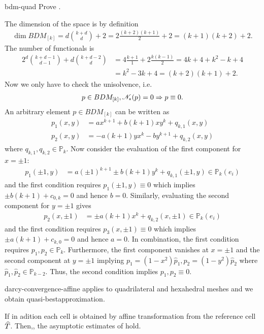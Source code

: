 \begin{Problem}{bdm-quad}
  Prove .
\begin{solution}
 The dimension of the space is by definition
 \begin{align}
    \dim BDM_{[k]} = d\binom{k+d}{d}+2=2\frac{(k+2)(k+1)}{2}+2=(k+1)(k+2)+2.
 \end{align}
 The number of functionals is
 \begin{align}
  2^d \binom{k+d-1}{d-1}+d \binom{k+d-2}{d} &= 4 \frac{k+1}{1}+2\frac{k(k-1)}{2}
  = 4k+4+k^2-k+4\\
  &= k^2-3k+4 = (k+2)(k+1)+2.
 \end{align}
 Now we only have to check the unisolvence, i.e.
 \begin{align}
p\in BDM_{[k]}, \mathscr N_* (p) = 0 \Rightarrow p \equiv 0.
\end{align}
 An arbitrary element $p\in BDM_{[k]}$ can be written as
 \begin{align}
  p_1 (x,y) &= a x^{k+1} +b (k+1) x y^k+ q_{k,1}(x,y) \\
  p_2 (x,y) &= -a (k+1) y x^k-b y^{k+1}+ q_{k,2}(x,y)
 \end{align}
 where $q_{k,1},q_{k,2}\in \mathbb{P}_k$. Now consider the evaluation of the first component for $x=\pm1$:
 \begin{align}
  p_1 (\pm1,y) &= a (\pm1)^{k+1} \pm b (k+1) y^k+ q_{k,1}(\pm1,y)\in \mathbb{P}_k(e_i)
 \end{align}
 and the first condition requires $p_1 (\pm1,y)\equiv 0$ which implies $\pm b(k+1)+c_{0,k}=0$ and hence $b=0$.
 Similarly, evaluating the second component for $y=\pm1$ gives
 \begin{align}
  p_2 (x,\pm1) &= \pm a (k+1) x^k+ q_{k,2}(x,\pm1)\in \mathbb{P}_k(e_i)
 \end{align}
 and the first condition requires $p_3 (x,\pm1)\equiv 0$ which implies $\pm a(k+1)+c_{k,0}=0$ and hence $a=0$.
 In combination, the first condition requires $p_1,p_2\in \mathbb{P}_k$. Furthermore, the first component vanishes
 at $x=\pm1$ and the second component at $y=\pm1$ implying $p_1=(1-x^2) \hat{p}_1, p_2=(1-y^2) \hat{p}_2$
 where $\hat{p}_1, \hat{p}_2 \in \mathbb{P}_{k-2}$. Thus, the second condition implies $p_1, p_2\equiv 0$.
\end{solution}

\end{Problem}

\begin{Corollary}{darcy-convergence-affine}
   applies to quadrilateral and
  hexahedral meshes and we obtain quasi-bestapproximation.

  If in adition each cell is obtained by affine transformation from
  the reference cell $\widehat{T}$. Then,, the asymptotic estimates of
   hold.
\end{Corollary}

